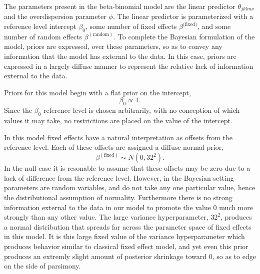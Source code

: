 \documentclass[12pt]{article}
\begin{document}
%
The parameters present in the beta-binomial model are the linear predictor 
\(\theta_{jklm\nu}\) and the overdispersion parameter $\phi$. The linear 
predictor is parameterized with a reference level intercept $\beta_0$, 
some number of fixed effects $\beta^\text{(fixed)}$, and some number of random 
effects $\beta^{(\text{random})}$. To complete the Bayesian formulation of the 
model, priors are expressed, over these parameters, so as to convey any 
information that the model has external to the data. In this case, priors are 
expressed in a largely diffuse manner to represent the relative lack of 
information external to the data.  

%
Priors for this model begin with a flat prior on the intercept, 
%
\begin{equation}
\beta_0 \propto 1.
\end{equation}
%
Since the \(\beta_0\) reference level is chosen arbitrarily, with no
conception of which values it may take, no restrictions are placed on
the value of the intercept.

%
In this model fixed effects have a natural interpretation as offsets from the 
reference level. Each of these offsets are assigned a diffuse normal prior,
%
\begin{equation}
\beta^{(\text{fixed})} \sim N(0, 32^2).
\end{equation}
%
In the null case it is resonable to assume that these offsets may be zero due 
to a lack of difference from the reference level. However, in the Bayesian 
setting parameters are random variables, and do not take any one particular 
value, hence the distributional assumption of normality. Furthermore there is 
no strong information external to the data in our model to promote the value 0 
much more strongly than any other value. The large variance hyperparameter, 
$32^2$, produces a normal distribution that spreads far across the parameter 
space of fixed effects in this model. It is this large fixed value of the 
variance hyperparameter which produces behavior similar to classical fixed 
effect model, and yet even this prior produces an extremly slight amount of 
posterior shrinkage toward 0, so as to edge on the side of parsimony.
\end{document}
